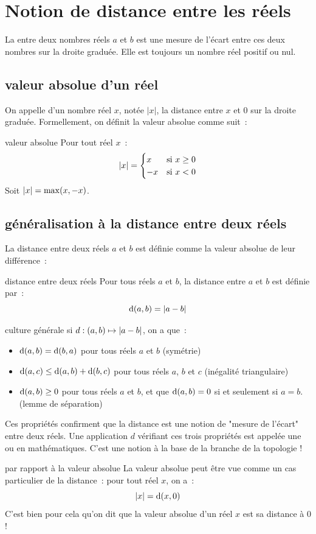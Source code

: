 \section{Notion de distance entre les réels}
La  entre deux nombres réels $a$ et $b$ est une mesure de l'écart entre ces deux nombres sur la droite graduée. Elle est toujours un nombre réel positif ou nul.

\subsection{valeur absolue d'un réel}

On appelle  d'un nombre réel $x$, notée $|x|$, la distance entre $x$ et $0$ sur la droite graduée. Formellement, on définit la valeur absolue comme suit~:
\begin{definition}{}{valeur absolue}
    Pour tout réel $x$~:
    \[
    |x| = 
    \begin{cases} 
    x & \text{si } x \geq 0 \\ 
    -x & \text{si } x < 0 
    \end{cases}
    \]
    Soit $|x| = \max(x,-x)$.
\end{definition}

\subsection{généralisation à la distance entre deux réels}

La distance entre deux réels $a$ et $b$ est définie comme la valeur absolue de leur différence~:
\begin{definition}{}{distance entre deux réels}
    Pour tous réels $a$ et $b$, la distance entre $a$ et $b$ est définie par~:
    $$ \mathrm{d}(a, b) = |a - b| $$
\end{definition}

\begin{remarque}{}{culture générale}
    si $d : (a,b) \mapsto |a-b|$, on a que~:
    \begin{itemize}
        \item $\mathrm{d}(a, b) = \mathrm{d}(b, a)$ pour tous réels $a$ et $b$ (symétrie)
        \item $\mathrm{d}(a, c) \leq \mathrm{d}(a, b) + \mathrm{d}(b, c)$ pour tous réels $a$, $b$ et $c$ (inégalité triangulaire)
        \item $\mathrm{d}(a, b) \geq 0$ pour tous réels $a$ et $b$, et que $\mathrm{d}(a, b) = 0$ si et seulement si $a = b$. (lemme de séparation)
    \end{itemize}
    Ces propriétés confirment que la distance est une notion de "mesure de l'écart" entre deux réels. Une application $d$ vérifiant ces trois propriétés est appelée une  ou  en mathématiques. C'est une notion à la base de la branche de la topologie !
\end{remarque}

\begin{remarque}{}{par rapport à la valeur absolue}
    La valeur absolue peut être vue comme un cas particulier de la distance~: pour tout réel $x$, on a~:
    $$ |x| = \mathrm{d}(x, 0) $$
    C'est bien pour cela qu'on dit que la valeur absolue d'un réel $x$ est sa distance à 0 !
\end{remarque}

